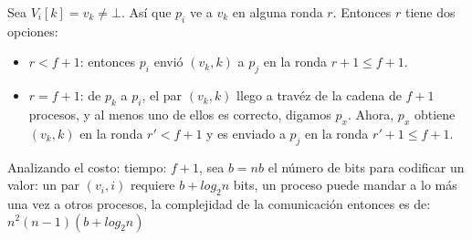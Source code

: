 \documentclass{article}
\begin{document}
\begin{enumerate}
{\begin{itemize}
{        Sea  $V_{i}[k] = v_{k} \neq \bot$. Así que $p_{i}$ ve a $v_{k}$ en alguna
        ronda $r$. Entonces $r$ tiene dos opciones:
        \begin{itemize}
          \item {$r < f + 1$: entonces $p_{i}$ envió $(v_{k}, k)$ a $p_{j}$ en
          la ronda $r + 1 \leqslant f + 1$. }
          \item {$r = f + 1$: de $p_{k}$ a $p_{i}$, el par $(v_{k}, k)$ llego a travéz
          de la cadena de $f + 1$ procesos, y al menos uno de ellos es correcto,
          digamos $p_{x}$. Ahora, $p_{x}$ obtiene $(v_{k}, k)$ en la ronda $r' < f + 1$
          y es enviado a $p_{j}$ en la ronda $r' + 1 \leqslant f + 1$.}
        \end{itemize}
        }
      \end{itemize}
      Analizando el costo: tiempo: $f + 1$, sea $b = nb$ el número de bits para
      codificar un valor: un par $(v_{i}, i)$ requiere $b + log_{2}n$ bits, un
      proceso puede mandar a lo más una vez a otros procesos, la complejidad de
      la comunicación entonces es de:\\
      $n^{2}(n - 1)(b + log_{2}n)$


    }
    
\end{enumerate}
\end{document}
